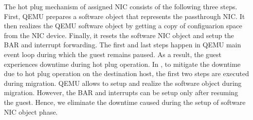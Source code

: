 The hot plug mechanism of assigned NIC consists of the following three steps. 
First, QEMU prepares a software object that represents the passthrough NIC.
It then realizes the QEMU software object by getting a copy of configuarion
space from the NIC device. Finally, it resets the software NIC object and 
setup the BAR and interrupt forwarding. The first and last steps happen in
QEMU main event loop during which the guest remains paused. As a result,
the guest experiences downtime during hot plug operation. In \na, to 
mitigate the downtime due to hot plug operation on the 
destination host, the first two steps are executed during migration.
QEMU allows to setup and realize the software object during migration.
However, the BAR and interrupts can be setup only after resuming the guest.
Hence, we eliminate the downtime caused during the setup of software NIC object
phase.	 
